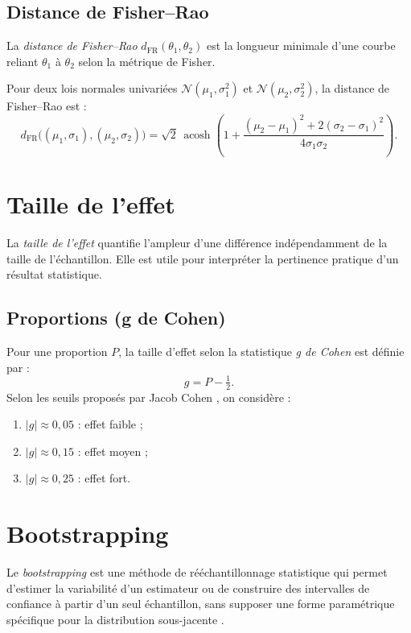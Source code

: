 \subsection{Distance de Fisher–Rao}
La \emph{distance de Fisher–Rao} $d_{\mathrm{FR}}(\theta_1,\theta_2)$ est la longueur minimale d’une courbe reliant $\theta_1$ à $\theta_2$ selon la métrique de Fisher.

Pour deux lois normales univariées $\mathcal{N}(\mu_1, \sigma_1^2)$ et $\mathcal{N}(\mu_2, \sigma_2^2)$, la distance de Fisher–Rao est \citep{nielsen2023simple} :
\begin{equation}
	d_{\mathrm{FR}}\big((\mu_1,\sigma_1),(\mu_2,\sigma_2)\big)
	= \sqrt{2}\,\operatorname{acosh}\!\left(1 + \frac{(\mu_2 - \mu_1)^2 + 2(\sigma_2 - \sigma_1)^2}{4\sigma_1\sigma_2}\right).
	\label{eq:fr_normal}
\end{equation}

\section{Taille de l'effet}
La \emph{taille de l'effet} quantifie l'ampleur d'une différence indépendamment de la taille de l’échantillon. Elle est utile pour interpréter la pertinence pratique d’un résultat statistique.

\subsection{Proportions (g de Cohen)}
Pour une proportion $P$, la taille d’effet selon la statistique \emph{g de Cohen} est définie par :
\begin{equation}
	g = P - \tfrac{1}{2}.
	\label{eq:g_cohen}
\end{equation}
Selon les seuils proposés par Jacob Cohen \citep{cohen1992power}, on considère :
\begin{enumerate}
	\item $|g| \approx 0{,}05$ : effet faible ;
	\item $|g| \approx 0{,}15$ : effet moyen ;
	\item $|g| \approx 0{,}25$ : effet fort.
\end{enumerate}

\section{Bootstrapping}
Le \emph{bootstrapping} est une méthode de rééchantillonnage statistique qui permet d'estimer la variabilité d'un estimateur ou de construire des intervalles de confiance à partir d'un seul échantillon, sans supposer une forme paramétrique spécifique pour la distribution sous-jacente \citep{tibshirani1993introduction}.

